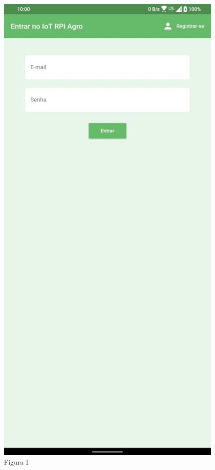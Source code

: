 \documentclass[eso]{bcc}
\begin{document}
\begin{figure}[htbp]
\centerline{\includegraphics[scale=.25]{Figuras/figura-i.jpg}}
\caption{Figura I}\label{fig-i}
\end{figure}
\end{document}
